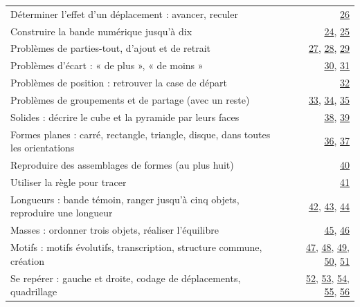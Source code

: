{\begin{tabularx}{\linewidth}{@{}Xr@{}}
Déterminer l’effet d’un déplacement : avancer, reculer & \hyperref[act-gs-26]{26}\\[1.6mm]
Construire la bande numérique jusqu’à dix & \hyperref[act-gs-24]{24}, \hyperref[act-gs-25]{25}\\[1.6mm]
Problèmes de parties-tout, d’ajout et de retrait & \hyperref[act-gs-27]{27}, \hyperref[act-gs-28]{28}, \hyperref[act-gs-29]{29}\\[1.6mm]
Problèmes d’écart : « de plus », « de moins » & \hyperref[act-gs-30]{30}, \hyperref[act-gs-31]{31}\\[1.6mm]
Problèmes de position : retrouver la case de départ & \hyperref[act-gs-32]{32}\\[1.6mm]
Problèmes de groupements et de partage (avec un reste) & \hyperref[act-gs-33]{33}, \hyperref[act-gs-34]{34}, \hyperref[act-gs-35]{35}\\[1.6mm]
Solides : décrire le cube et la pyramide par leurs faces & \hyperref[act-gs-38]{38}, \hyperref[act-gs-39]{39}\\[1.6mm]
Formes planes : carré, rectangle, triangle, disque, dans toutes les orientations & \hyperref[act-gs-36]{36}, \hyperref[act-gs-37]{37}\\[1.6mm]
Reproduire des assemblages de formes (au plus huit) & \hyperref[act-gs-40]{40}\\[1.6mm]
Utiliser la règle pour tracer & \hyperref[act-gs-41]{41}\\[1.6mm]
Longueurs : bande témoin, ranger jusqu’à cinq objets, reproduire une longueur & \hyperref[act-gs-42]{42}, \hyperref[act-gs-43]{43}, \hyperref[act-gs-44]{44}\\[1.6mm]
Masses : ordonner trois objets, réaliser l’équilibre & \hyperref[act-gs-45]{45}, \hyperref[act-gs-46]{46}\\[1.6mm]
Motifs : motifs évolutifs, transcription, structure commune, création & \hyperref[act-gs-47]{47}, \hyperref[act-gs-48]{48}, \hyperref[act-gs-49]{49}, \hyperref[act-gs-50]{50}, \hyperref[act-gs-51]{51}\\[1.6mm]
Se repérer : gauche et droite, codage de déplacements, quadrillage & \hyperref[act-gs-52]{52}, \hyperref[act-gs-53]{53}, \hyperref[act-gs-54]{54}, \hyperref[act-gs-55]{55}, \hyperref[act-gs-56]{56}\\[1.6mm]
\bottomrule\end{tabularx}\par}
